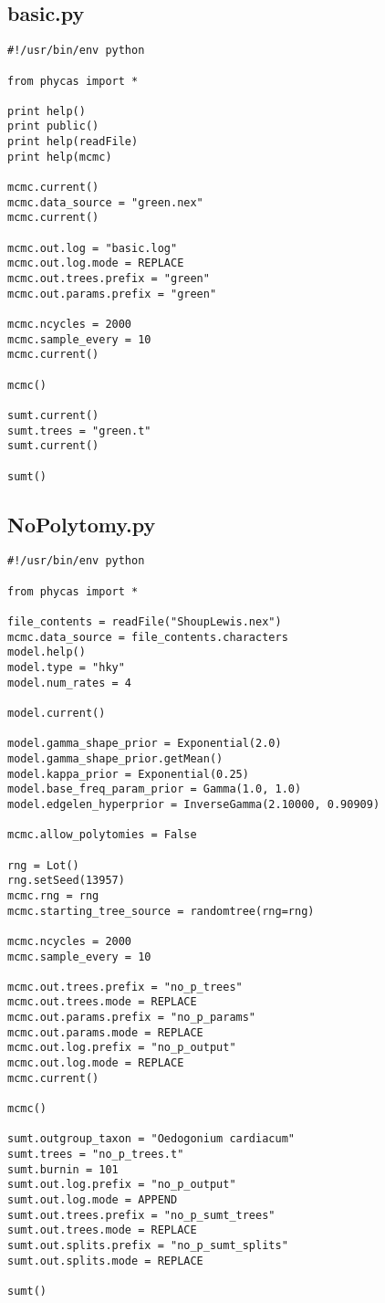 \documentclass{article}
\begin{document}
\subsection{basic.py}\label{basicpy}
\begin{verbatim}
#!/usr/bin/env python

from phycas import *

print help()
print public()
print help(readFile)
print help(mcmc)

mcmc.current()
mcmc.data_source = "green.nex"
mcmc.current()

mcmc.out.log = "basic.log"
mcmc.out.log.mode = REPLACE
mcmc.out.trees.prefix = "green"
mcmc.out.params.prefix = "green"

mcmc.ncycles = 2000 
mcmc.sample_every = 10
mcmc.current()

mcmc()

sumt.current()
sumt.trees = "green.t"
sumt.current()

sumt()
\end{verbatim}


\newpage
\subsection{NoPolytomy.py}\label{NoPolytomy}
\begin{verbatim}
#!/usr/bin/env python

from phycas import *

file_contents = readFile("ShoupLewis.nex")
mcmc.data_source = file_contents.characters
model.help()
model.type = "hky"
model.num_rates = 4

model.current()

model.gamma_shape_prior = Exponential(2.0)
model.gamma_shape_prior.getMean()
model.kappa_prior = Exponential(0.25)
model.base_freq_param_prior = Gamma(1.0, 1.0)
model.edgelen_hyperprior = InverseGamma(2.10000, 0.90909)

mcmc.allow_polytomies = False

rng = Lot()
rng.setSeed(13957)
mcmc.rng = rng
mcmc.starting_tree_source = randomtree(rng=rng)

mcmc.ncycles = 2000
mcmc.sample_every = 10

mcmc.out.trees.prefix = "no_p_trees" 
mcmc.out.trees.mode = REPLACE 
mcmc.out.params.prefix = "no_p_params" 
mcmc.out.params.mode = REPLACE 
mcmc.out.log.prefix = "no_p_output" 
mcmc.out.log.mode = REPLACE 
mcmc.current()

mcmc()

sumt.outgroup_taxon = "Oedogonium cardiacum" 
sumt.trees = "no_p_trees.t" 
sumt.burnin = 101 
sumt.out.log.prefix = "no_p_output" 
sumt.out.log.mode = APPEND 
sumt.out.trees.prefix = "no_p_sumt_trees" 
sumt.out.trees.mode = REPLACE 
sumt.out.splits.prefix = "no_p_sumt_splits" 
sumt.out.splits.mode = REPLACE 

sumt()
\end{verbatim}
\end{document}
